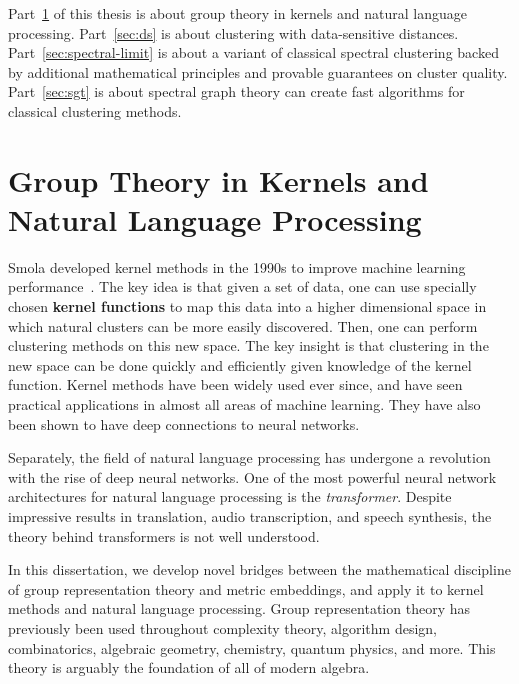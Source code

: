 Part~\ref{sec:group} of this thesis is about group theory in kernels and natural language
processing. Part~\ref{sec:ds} is about clustering with
data-sensitive distances. Part~\ref{sec:spectral-limit} is about
a variant of classical spectral clustering
backed by additional mathematical principles and provable guarantees on
cluster quality. Part~\ref{sec:sgt} is about spectral graph
theory can create fast algorithms for classical clustering methods.

\section{Group Theory in Kernels and Natural Language
  Processing}\label{sec:group}
  Smola developed kernel methods in the 1990s to improve machine
  learning performance~\cite{s96}. The key idea is that given a set of data, one
  can use specially chosen \textbf{kernel functions} to map this data into a higher dimensional space in
  which natural clusters can be more easily discovered. Then, one can perform clustering
  methods on this new space. The key insight is that clustering in the
  new space can be done quickly and efficiently given knowledge of the
  kernel function. Kernel methods have been widely used ever since, and
  have seen practical applications in almost all areas of machine
  learning. They have also been shown to have deep connections to
  neural networks.

  Separately, the field of natural language processing has undergone a
  revolution with the rise of deep neural networks. One of the most
  powerful neural network architectures for natural language processing is the
  \textit{transformer}. Despite impressive
  results in translation, audio transcription, and
  speech synthesis, the theory behind transformers is not well understood. 

  In this dissertation, we develop novel bridges between the
  mathematical discipline of group representation theory and metric
  embeddings, and apply it
  to kernel methods and natural language processing.  Group
  representation theory has previously been used throughout complexity theory, algorithm design,
  combinatorics, algebraic geometry, chemistry, quantum physics, and
  more. This theory is arguably the foundation of all of modern
  algebra.

